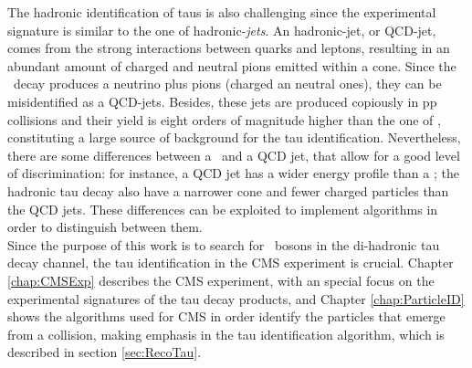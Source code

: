 \noindent The hadronic identification of taus is also challenging since 
the experimental signature is similar to the one of hadronic-\textit{jets}.
An hadronic-jet, or QCD-jet, comes from the strong interactions between 
quarks and leptons, resulting in an abundant amount of charged and neutral 
pions emitted within a cone. Since the \tauh~decay produces a neutrino 
plus pions (charged an neutral ones), they can be misidentified as a QCD-jets.
Besides, these jets are produced copiously in pp collisions and their yield is 
eight orders of magnitude higher than the one of \tauh, constituting a large
source of background for the tau identification. Nevertheless, there are some 
differences between a \tauh~and a QCD jet, that allow for a good level
of discrimination: for instance, a QCD jet has a wider energy profile than a \tauh;
the hadronic tau decay also have a narrower cone and fewer charged particles 
than the QCD jets. These differences can be exploited to implement 
algorithms in order to distinguish between them. \\

\noindent Since the purpose of this work is to search for \Zprime~bosons
in the di-hadronic tau decay channel, the tau identification in 
the CMS experiment is crucial. Chapter \ref{chap:CMSExp}
describes the CMS experiment, with an special focus on the 
experimental signatures of the tau decay products, and Chapter
\ref{chap:ParticleID} shows the algorithms used for CMS in order identify 
the particles that emerge from a collision, making emphasis 
in the tau identification algorithm, which is described in section \ref{sec:RecoTau}. \\








 

